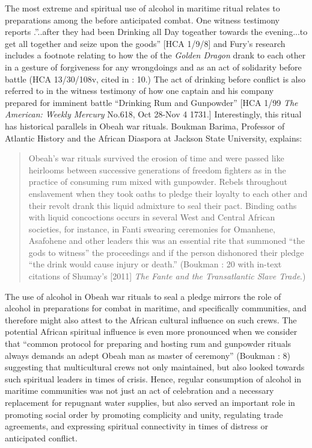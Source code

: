 The most extreme and spiritual use of alcohol in maritime ritual relates to preparations among the  before anticipated combat. One witness testimony reports .”..after they had been Drinking all Day togeather towards the evening...to get all together and seize upon the goods” [HCA 1/9/8] and Fury’s research includes a footnote relating to how the  of the \textit{Golden Dragon} drank to each other in a gesture of forgiveness for any wrongdoings and as an act of solidarity before battle (HCA 13/30/108v, cited in \citealt{Fury2015}: 10.) The act of drinking before conflict is also referred to in the witness testimony of how one captain and his company prepared for imminent battle “Drinking Rum and Gunpowder” [HCA 1/99 \textit{The American: Weekly Mercury} No.618, Oct 28-Nov 4 1731.] Interestingly, this ritual has historical parallels in Obeah war rituals. Boukman Barima, Professor of Atlantic History and the African Diaspora at Jackson State University, explains:

\begin{quotation}
Obeah’s war rituals survived the erosion of time and were passed like heirlooms between successive generations of freedom fighters as in the practice of consuming rum mixed with gunpowder. Rebels throughout enslavement when they took oaths to pledge their loyalty to each other and their revolt drank this liquid admixture to seal their pact. Binding oaths with liquid concoctions occurs in several West and Central African societies, for instance, in Fanti swearing ceremonies for Omanhene, Asafohene and other leaders this was an essential rite that summoned “the gods to witness” the proceedings and if the person dishonored their pledge “the drink would cause injury or death.” (Boukman \citealt{Barima2016}: 20 with in-text citations of Shumay’s [2011] \textit{The Fante and the Transatlantic Slave Trade}.)
\end{quotation}

The use of alcohol in Obeah war rituals to seal a pledge mirrors the role of alcohol in preparations for combat in maritime, and specifically  communities, and therefore might also attest to the African cultural influence on such crews. The potential African spiritual influence is even more pronounced when we consider that “common protocol for preparing and hosting rum and gunpowder rituals always demands an adept Obeah man as master of ceremony” (Boukman \citealt{Barima2016}: 8) suggesting that multicultural crews not only maintained, but also looked towards such spiritual leaders in times of crisis. Hence, regular consumption of alcohol in maritime communities was not just an act of celebration and a necessary replacement for repugnant water supplies, but also served an important role in promoting social order by promoting complicity and unity, regulating trade agreements, and expressing spiritual connectivity in times of distress or anticipated conflict. 

